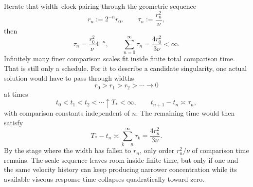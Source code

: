 Iterate that width--clock pairing through the geometric sequence
\[
  r_n:=2^{-n}r_0,
  \qquad
  \tau_n:=\frac{r_n^2}{\nu},
\]
then
\[
  \tau_n
  =
  \frac{r_0^2}{\nu}4^{-n},
  \qquad
  \sum_{n=0}^{\infty}\tau_n
  =
  \frac{4r_0^2}{3\nu}
  <
  \infty.
\]
Infinitely many finer comparison scales fit inside finite total comparison time. That is still only a schedule. For it to describe a candidate singularity, one actual solution would have to pass through widths
\[
  r_0>r_1>r_2>\cdots\longrightarrow0
\]
at times
\[
  t_0<t_1<t_2<\cdots\uparrow T_*<\infty,
  \qquad
  t_{n+1}-t_n\asymp\tau_n,
\]
with comparison constants independent of \(n\). The remaining time would then satisfy
\[
  T_*-t_n
  \asymp
  \sum_{k=n}^{\infty}\tau_k
  =
  \frac{4r_n^2}{3\nu}.
\]
By the stage where the width has fallen to \(r_n\), only order \(r_n^2/\nu\) of comparison time remains. The scale sequence leaves room inside finite time, but only if one and the same velocity history can keep producing narrower concentration while its available viscous response time collapses quadratically toward zero.